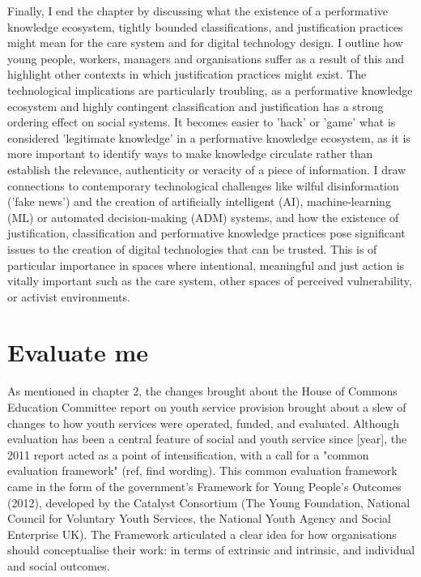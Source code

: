Finally, I end the chapter by discussing what the existence of a performative knowledge ecosystem, tightly bounded classifications, and justification practices might mean for the care system and for digital technology design. I outline how young people, workers, managers and organisations suffer as a result of this and highlight other contexts in which justification practices might exist. The technological implications are particularly troubling, as a performative knowledge ecosystem and highly contingent classification and justification has a strong ordering effect on social systems. It becomes easier to 'hack' or 'game' what is considered 'legitimate knowledge' in a performative knowledge ecosystem, as it is more important to identify ways to make knowledge circulate rather than establish the relevance, authenticity or veracity of a piece of information. I draw connections to contemporary technological challenges like wilful disinformation ('fake news') and the creation of artificially intelligent (AI), machine-learning (ML) or automated decision-making (ADM) systems, and how the existence of justification, classification and performative knowledge practices pose significant issues to the creation of digital technologies that can be trusted. This is of particular importance in spaces where intentional, meaningful and just action is vitally important such as the care system, other spaces of perceived vulnerability, or activist environments.

\section{Evaluate me}
As mentioned in chapter 2, the changes brought about the House of Commons Education Committee report on youth service provision brought about a slew of changes to how youth services were operated, funded, and evaluated. Although evaluation has been a central feature of social and youth service since [year], the 2011 report acted as a point of intensification, with a call for a "common evaluation framework" (ref, find wording). This common evaluation framework came in the form of the government's Framework for Young People's Outcomes (2012), developed by the Catalyst Consortium (The Young Foundation, National Council for Voluntary Youth Services, the National Youth Agency and Social Enterprise UK). The Framework articulated a clear idea for how organisations should conceptualise their work: in terms of extrinsic and intrinsic, and individual and social outcomes.

